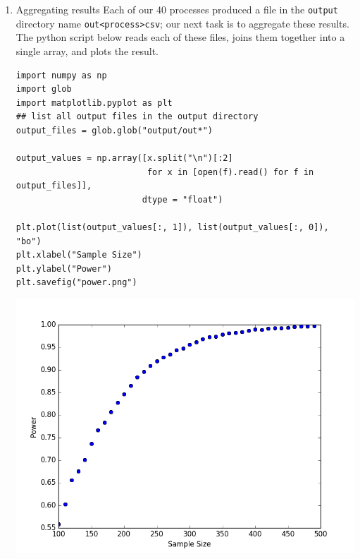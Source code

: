 \documentclass[11pt]{article}
\begin{document}
\begin{enumerate}
Now we can set up the simulation as before, passing the \texttt{n} calculated above into our simulation function, writing the results to files. 
\begin{verbatim}
## function to simulate data and perform a t.test
import numpy as np
from scipy import stats

## function to simulate data and perform a t.test
def sim_ttest(mu1, mu2, sd, n1, n2):
    x = stats.norm.rvs(loc = mu1, scale = sd, size = n1)
    y = stats.norm.rvs(loc = mu2, scale = sd, size = n2)
    return(stats.ttest_ind(x, y)[1])

##  run the function 10,000 times
nsims = 10000
p = [sim_ttest(1, 1.3, 1, n, n)  for x in range(nsims)]
print(len([x for x in p if x < .05])/nsims)
print(n)
\end{verbatim}

Now we have all the required elements to submit out job, and can do so using \texttt{condor\_submit} as before. 

\item Aggregating results
\label{sec:org7935f72}
Each of our 40 processes produced a file in the \texttt{output} directory name \texttt{out<process>csv}; our next task is to aggregate these results. The python script below reads each of these files, joins them together into a single array, and plots the result.
\begin{verbatim}
import numpy as np
import glob
import matplotlib.pyplot as plt
## list all output files in the output directory
output_files = glob.glob("output/out*")

output_values = np.array([x.split("\n")[:2]
                          for x in [open(f).read() for f in output_files]],
                         dtype = "float")

plt.plot(list(output_values[:, 1]), list(output_values[:, 0]), "bo")
plt.xlabel("Sample Size")
plt.ylabel("Power")
plt.savefig("power.png")
\end{verbatim}

\begin{center}
\includegraphics[width=.9\linewidth]{images/python_powerDist.png}
\end{center}


\end{enumerate}
\end{document}
